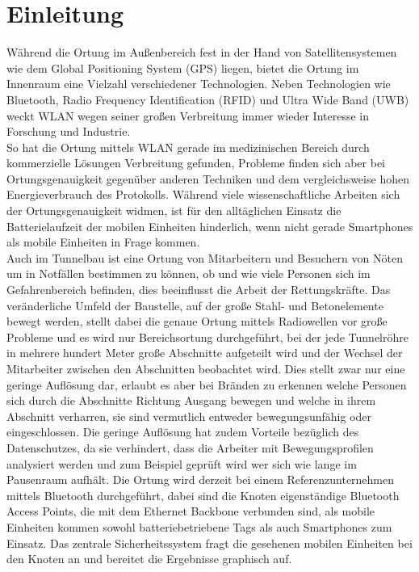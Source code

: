
\chapter{Einleitung}
\label{ch:Einleitung}
Während die Ortung im Außenbereich fest in der Hand von Satellitensystemen wie dem Global Positioning System (GPS) liegen, bietet die Ortung im Innenraum eine Vielzahl verschiedener Technologien. Neben Technologien wie Bluetooth, Radio Frequency Identification (RFID) und Ultra Wide Band (UWB) weckt WLAN wegen seiner großen Verbreitung immer wieder Interesse in Forschung und Industrie. \\
So hat die Ortung mittels WLAN gerade im medizinischen Bereich durch kommerzielle Lösungen Verbreitung gefunden, Probleme finden sich aber bei Ortungsgenauigkeit gegenüber anderen Techniken und dem vergleichsweise hohen Energieverbrauch des Protokolls.
Während viele wissenschaftliche Arbeiten sich der Ortungsgenauigkeit widmen, ist für den alltäglichen Einsatz die Batterielaufzeit der mobilen Einheiten hinderlich, wenn nicht gerade Smartphones als mobile Einheiten in Frage kommen. \\
Auch im Tunnelbau ist eine Ortung von Mitarbeitern und Besuchern von Nöten um in Notfällen bestimmen zu können, ob und wie viele Personen sich im Gefahrenbereich befinden, dies beeinflusst die Arbeit der Rettungskräfte. 
Das veränderliche Umfeld der Baustelle, auf der große Stahl- und Betonelemente bewegt werden, stellt dabei die genaue Ortung mittels Radiowellen vor große Probleme und es wird nur Bereichsortung durchgeführt, bei der jede Tunnelröhre in mehrere hundert Meter große Abschnitte aufgeteilt wird und der Wechsel der Mitarbeiter zwischen den Abschnitten beobachtet wird. 
Dies stellt zwar nur eine geringe Auflösung dar, erlaubt es aber bei Bränden zu erkennen welche Personen sich durch die Abschnitte Richtung Ausgang bewegen und welche in ihrem Abschnitt verharren, sie sind vermutlich entweder bewegungsunfähig oder eingeschlossen. 
Die geringe Auflösung hat zudem Vorteile bezüglich des Datenschutzes, da sie verhindert, dass die Arbeiter mit Bewegungsprofilen analysiert werden und zum Beispiel geprüft wird wer sich wie lange im Pausenraum aufhält.
Die Ortung wird derzeit bei einem Referenzunternehmen mittels Bluetooth durchgeführt, dabei sind die Knoten eigenständige Bluetooth Access Points, die mit dem Ethernet Backbone verbunden sind, als mobile Einheiten kommen sowohl batteriebetriebene Tags als auch Smartphones zum Einsatz. 
Das zentrale Sicherheitssystem fragt die gesehenen mobilen Einheiten bei den Knoten an und bereitet die Ergebnisse graphisch auf.
 
